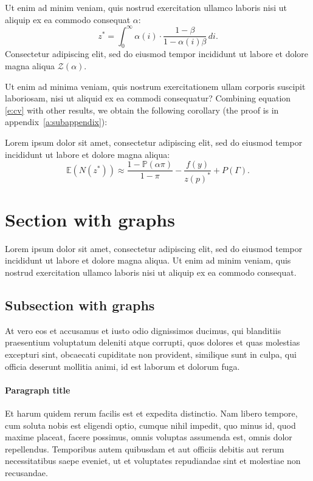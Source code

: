 \documentclass[letterpaper,12pt,leqno]{article}
\begin{document}
\begin{lemma}\label{p:cv} Ut enim ad minim veniam, quis nostrud exercitation ullamco laboris nisi ut aliquip ex ea commodo consequat $\alpha$:
\begin{equation}
z^* = \int_{0}^{\infty} \alpha(i) \cdot \frac{1-\beta}{1-\alpha(i)\beta}\,di.
\label{e:cv}\end{equation}
Consectetur adipiscing elit, sed do eiusmod tempor incididunt ut labore et dolore magna aliqua $\mathcal{Z}(\alpha)$. \end{lemma}

Ut enim ad minima veniam, quis nostrum exercitationem ullam corporis suscipit laboriosam, nisi ut aliquid ex ea commodi consequatur? Combining equation \eqref{e:cv} with other results, we obtain the following corollary (the proof is in appendix~\ref{a:subappendix}): 

\begin{corollary} Lorem ipsum dolor sit amet, consectetur adipiscing elit, sed do eiusmod tempor incididunt ut labore et dolore magna aliqua:
\begin{equation*}
\mathbb{E}(N(z^*)) \approx \frac{1-\mathbb{P}(\alpha\pi)}{1-\pi}- \frac{f(y)}{z(p)^*} +P(\Gamma).
\end{equation*}\end{corollary}

\section{Section with graphs}\label{s:graphs}

Lorem ipsum dolor sit amet, consectetur adipiscing elit, sed do eiusmod tempor incididunt ut labore et dolore magna aliqua. Ut enim ad minim veniam, quis nostrud exercitation ullamco laboris nisi ut aliquip ex ea commodo consequat.

\subsection{Subsection with graphs}

At vero eos et accusamus et iusto odio dignissimos ducimus, qui blanditiis praesentium voluptatum deleniti atque corrupti, quos dolores et quas molestias excepturi sint, obcaecati cupiditate non provident, similique sunt in culpa, qui officia deserunt mollitia animi, id est laborum et dolorum fuga. 

\paragraph{Paragraph title} Et harum quidem rerum facilis est et expedita distinctio. Nam libero tempore, cum soluta nobis est eligendi optio, cumque nihil impedit, quo minus id, quod maxime placeat, facere possimus, omnis voluptas assumenda est, omnis dolor repellendus. Temporibus autem quibusdam et aut officiis debitis aut rerum necessitatibus saepe eveniet, ut et voluptates repudiandae sint et molestiae non recusandae. 
\end{document}
